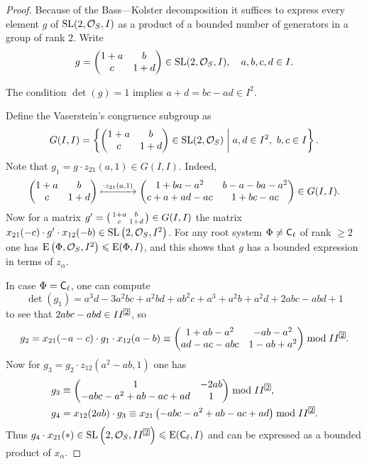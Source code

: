 \begin{proof}
Because of the Bass---Kolster decomposition it suffices to express every element $g$ of $\operatorname{SL}(2,\mathcal{O}_S,I)$ as a product of a bounded number of generators in a group of rank $2$. Write
\[ g=\begin{pmatrix}1+a & b \\ c & 1+d\end{pmatrix}\in\operatorname{SL}(2,\mathcal{O}_S,I),\quad a,b,c,d\in I. \]

The condition $\det(g)=1$ implies $a+d=bc-ad\in I^2$.

Define the Vaserstein's congruence subgroup as
\[ G(I,I)=\left\{ \begin{pmatrix}1+a & b \\ c & 1+d\end{pmatrix}\in\SL(2,\mathcal{O}_S)\;\middle|\; a,d\in I^2,\ b,c\in I \right\}. \]
Note that $g_1=g\cdot z_{21}(a,1)\in G(I,I)$. Indeed,
\[
\begin{pmatrix}
1+a & b \\ c & 1+d
\end{pmatrix} \xmapsto{\cdot z_{21}(a,1)}
\begin{pmatrix}
1+ba-a^2 & b-a-ba-a^2 \\ c+a+ad-ac & 1+bc-ac
\end{pmatrix} \in G(I,I).
\]
Now for a matrix $g'=\begin{psmallmatrix}1+a & b \\ c & 1+d\end{psmallmatrix}\in G(I,I)$ the matrix $x_{21}(-c)\cdot g'\cdot x_{12}(-b)\in\operatorname{SL}\left(2,\mathcal{O}_S,I^2\right)$. For any root system $\Phi\neq\mathsf{C}_\ell$ of rank $\geqslant2$ one has $\operatorname{E}\left(\Phi,\mathcal{O}_S,I^2\right)\leqslant\operatorname{E}(\Phi,I)$, and this shows that $g$ has a bounded expression in terms of $z_\alpha$.

In case $\Phi=\mathsf{C}_\ell$, one can compute
\[ \det(g_1)=a^3d-3a^2bc+a^2bd+ab^2c+a^3+a^2b+a^2d+2abc-abd+1 \]
to see that $2abc-abd\in II^{\indexbox{2}}$, so
\[ g_2=x_{21}(-a-c)\cdot g_1\cdot x_{12}(a-b)\equiv
\begin{pmatrix}
1+ab-a^2 & -ab-a^2 \\ ad-ac-abc & 1-ab+a^2
\end{pmatrix}\bmod II^{\indexbox{2}}. \]
Now for $g_3=g_2\cdot z_{12}\left(a^2-ab,1\right)$ one has
\begin{align*}
& g_3\equiv\begin{pmatrix} 1 & -2ab \\ -abc-a^2+ab-ac+ad & 1 \end{pmatrix}\bmod II^{\indexbox{2}},\\
& g_4=x_{12}(2ab)\cdot g_3\equiv x_{21}\left(-abc-a^2+ab-ac+ad\right)\bmod II^{\indexbox{2}}.
\end{align*}
Thus $g_4\cdot x_{21}(*)\in\SL\left(2,\mathcal{O}_S,II^{\indexbox{2}}\right)\leqslant\E(\rC_\ell,I)$ and can be expressed as a bounded product of $x_\alpha$.
\end{proof}